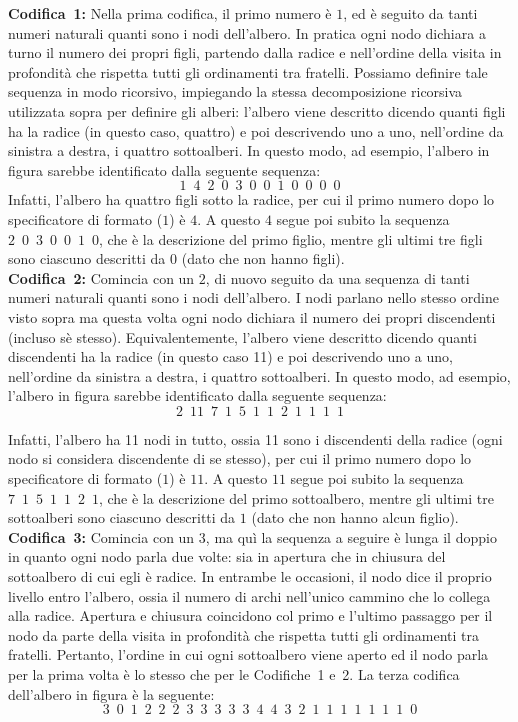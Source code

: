 \documentclass[a4paper,11pt]{article}
\begin{document}
\noindent
{\bf Codifica~1:}
Nella prima codifica, il primo numero è $1$, ed è seguito da tanti numeri naturali quanti sono i nodi dell'albero. In pratica ogni nodo dichiara a turno il numero dei propri figli, partendo dalla radice e nell'ordine della visita in profondità che rispetta tutti gli ordinamenti tra fratelli.
Possiamo definire tale sequenza in modo ricorsivo, impiegando la stessa decomposizione ricorsiva utilizzata sopra per definire gli alberi:
l'albero viene descritto dicendo quanti figli ha la radice (in questo caso, quattro) e poi descrivendo uno a uno, nell'ordine da sinistra a destra, i quattro sottoalberi. In questo modo, ad esempio, l'albero in figura sarebbe identificato dalla seguente sequenza:
\[
1\,\,\,4\,\,\,2\,\,\,0\,\,\,3\,\,\,0\,\,\,0\,\,\,1\,\,\,0\,\,\,0\,\,\,0\,\,\,0
\]      
Infatti, l'albero ha quattro figli sotto la radice, per cui il primo numero dopo lo specificatore di formato ($1$) \`e $4$. A questo $4$ segue poi subito la sequenza $2\,\,\,0\,\,\,3\,\,\,0\,\,\,0\,\,\,1\,\,\,0$, che \`e la descrizione del primo figlio, mentre gli ultimi tre figli sono ciascuno descritti da $0$ (dato che non hanno figli).\\

\noindent
{\bf Codifica~2:}
Comincia con un $2$,
di nuovo seguito da una sequenza di tanti numeri naturali quanti sono i nodi dell'albero.
I nodi parlano nello stesso ordine visto sopra ma questa volta ogni nodo dichiara il numero dei propri discendenti (incluso sè stesso).
Equivalentemente, l'albero viene descritto dicendo quanti discendenti ha la radice (in questo caso 11) e poi descrivendo uno a uno, nell'ordine da sinistra a destra, i quattro sottoalberi. In questo modo, ad esempio, l'albero in figura sarebbe identificato dalla seguente sequenza:
\[
2\,\,\,11\,\,\,7\,\,\,1\,\,\,5\,\,\,1\,\,\,1\,\,\,2\,\,\,1\,\,\,1\,\,\,1\,\,\,1
\]	

Infatti, l'albero ha 11 nodi in tutto, ossia 11 sono i discendenti della radice (ogni nodo si considera discendente di se stesso), per cui il primo numero dopo lo specificatore di formato ($1$) \`e $11$. A questo $11$ segue poi subito la sequenza $7\,\,\,1\,\,\,5\,\,\,1\,\,\,1\,\,\,2\,\,\,1$, che \`e la descrizione del primo sottoalbero, mentre gli ultimi tre sottoalberi sono ciascuno descritti da $1$ (dato che non hanno alcun figlio).\\

\noindent
{\bf Codifica~3:}
Comincia con un $3$,
ma quì la sequenza a seguire è lunga il doppio in quanto ogni nodo parla due volte:
sia in apertura che in chiusura del sottoalbero di cui egli è radice.
In entrambe le occasioni, il nodo dice il proprio livello entro l'albero, ossia il numero di archi nell'unico cammino che lo collega alla radice.
Apertura e chiusura coincidono col primo e l'ultimo passaggo per il nodo da parte della visita in profondità che rispetta tutti gli ordinamenti tra fratelli.
Pertanto, l'ordine in cui ogni sottoalbero viene aperto ed il nodo parla per la prima volta è lo stesso che per le Codifiche~1 e~2. 
La terza codifica dell'albero in figura è la seguente:
\[
3\,\,\,0\,\,\,1\,\,\,2\,\,\,2\,\,\,2\,\,\,3\,\,\,3\,\,\,3\,\,\,3\,\,\,3\,\,\,4\,\,\,4\,\,\,3\,\,\,2\,\,\,1\,\,\,1\,\,\,1\,\,\,1\,\,\,1\,\,\,1\,\,\,1\,\,\,0
\]	
\end{document}

